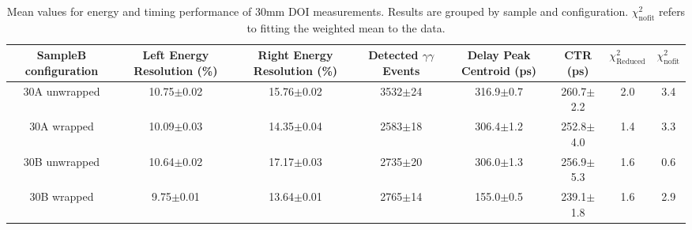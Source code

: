 \begin{table}
\caption{\label{tab:doictrresults} Mean values for energy and timing performance of 30mm DOI measurements. Results are grouped by sample and configuration. $\chi^2_\text{nofit}$ refers to fitting the weighted mean to the data.}
\begin{tabular}{cccccccc}
\hline
SampleB configuration & Left Energy Resolution (\%) & Right Energy Resolution (\%) & Detected $\gamma\gamma$ Events & Delay Peak Centroid (ps)  & CTR (ps) &  $\chi^2_\text{Reduced}$ &  $\chi^2_\text{nofit}$ \\
\hline
30A     unwrapped     &  10.75$\pm$0.02 &  15.76$\pm$0.02 &  3532$\pm$24 &  316.9$\pm$0.7 &  260.7$\pm$2.2 &        2.0 &    3.4 \\
30A     wrapped       &  10.09$\pm$0.03 &  14.35$\pm$0.04 &  2583$\pm$18 &  306.4$\pm$1.2 &  252.8$\pm$4.0 &        1.4 &    3.3 \\
30B     unwrapped     &  10.64$\pm$0.02 &  17.17$\pm$0.03 &  2735$\pm$20 &  306.0$\pm$1.3 &  256.9$\pm$5.3 &        1.6 &    0.6 \\
30B     wrapped       &   9.75$\pm$0.01 &  13.64$\pm$0.01 &  2765$\pm$14 &  155.0$\pm$0.5 &  239.1$\pm$1.8 &        1.6 &    2.9 \\
\hline
\end{tabular}
\end{table}

